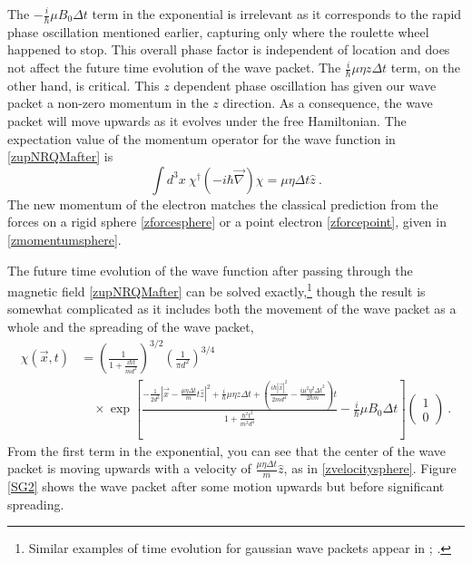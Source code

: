 \documentclass[12pt,secnumarabic,amsmath,amssymb,balancelastpage,nofootinbib]{article}
\begin{document}
The $-\frac{i}{\hbar}\mu B_0 \Delta t$ term in the exponential is irrelevant as it corresponds to the rapid phase oscillation mentioned earlier, capturing only where the roulette wheel happened to stop.  This overall phase factor is independent of location and does not affect the future time evolution of the wave packet.  The $\frac{i}{\hbar}\mu \eta z \Delta t$ term, on the other hand, is critical.  This $z$ dependent phase oscillation has given our wave packet a non-zero momentum in the $z$ direction.  As a consequence, the wave packet will move upwards as it evolves under the free Hamiltonian. The expectation value of the momentum operator for the wave function in \eqref{zupNRQMafter} is
\begin{equation}
\int d^3 x \ \chi^{\dagger} \left( -i \hbar \vec{\nabla} \right) \chi = \mu \eta \Delta t \hat{z}
\ .
\label{momentumexpectation}
\end{equation}
The new momentum of the electron matches the classical prediction from the forces on a rigid sphere \eqref{zforcesphere} or a point electron \eqref{zforcepoint}, given in \eqref{zmomentumsphere}.

The future time evolution of the wave function after passing through the magnetic field \eqref{zupNRQMafter} can be solved exactly,\footnote{Similar examples of time evolution for gaussian wave packets appear in \citet[problem 2.43]{griffithsQM}; \citet[problem 5.8]{ballentine}.} though the result is somewhat complicated as it includes both the movement of the wave packet as a whole and the spreading of the wave packet,
\begin{align}
\chi(\vec{x},t) &= \left(\frac{1}{1+ \frac{i \hbar t}{m d^2}}\right)^{3/2} \left(\frac{1}{\pi d^2}\right)^{3/4} 
\\
&\quad\times \exp\left[\frac{-\frac{1}{2d^2}|\vec{x}-\frac{\mu \eta \Delta t}{m}t\hat{z}|^2 + \frac{i}{\hbar}\mu \eta z \Delta t+\left(\frac{i \hbar |\vec{x}|^2}{2 m d^4}-\frac{i \mu^2 \eta^2 \Delta t^2}{2 \hbar m}\right)t}{1+\frac{\hbar^2 t^2}{m^2 d^4}}- \frac{i}{\hbar}\mu B_0 \Delta t\right] \left(\begin{matrix} 1\\0 \end{matrix}\right)\ .
\end{align}
From the first term in the exponential, you can see that the center of the wave packet is moving upwards with a velocity of $\frac{\mu \eta \Delta t}{m} \hat{z}$, as in \eqref{zvelocitysphere}.  Figure \ref{SG2} shows the wave packet after some motion upwards but before significant spreading.
\end{document}
